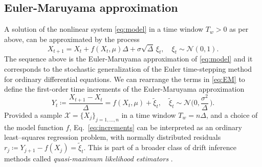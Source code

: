 \documentclass[openacc]{rsproca_new}
\begin{document}
\subsection{Euler-Maruyama approximation}\label{subsec:LLS}
A solution of the nonlinear system \eqref{eq:model} in a time window $T_w>0$ as per above, can be approximated by the process \cite[\S~$8.4$]{Lord2014}
%
\begin{equation}\label{eq:EM}
        X_{t+1} = X_t + f(X_t,\mu)\Delta + \sigma\sqrt{\Delta}\,\xi_t , \quad \xi_t\sim\mathcal{N}(0,1) .
\end{equation}
%
The sequence above is the Euler-Maruyama approximation of \eqref{eq:model} and it corresponds to the stochastic generalization of the Euler time-stepping method for ordinary differential equations.
We can rearrange the terms in \eqref{eq:EM} to define the first-order time increments of the Euler-Maruyama approximation
%
\begin{equation}\label{eq:increments}
        Y_t\coloneqq\frac{X_{t+1} - X_t}{\Delta} = f(X_t,\mu) + \tilde{\xi}_t , \quad \tilde{\xi}_t\sim\mathcal{N}\biggl(0,\frac{\sigma^2}{\Delta}\,\biggr) .
\end{equation}
%
Provided a sample $\mathcal{X} = \{X_j\}_{j=1,\dots,n}$ in a time window $T_w=n\Delta$, and a choice of the model function $f$, Eq.~\eqref{eq:increments} can be interpreted as an ordinary least--squares regression problem, with normally distributed residuals $r_j\coloneqq Y_{j+1} - f(X_j)=\tilde{\xi}_t$.
This is part of a broader class of drift inference methods called \emph{quasi-maximum likelihood estimators} \cite{Jimenez2020}.
\end{document}
